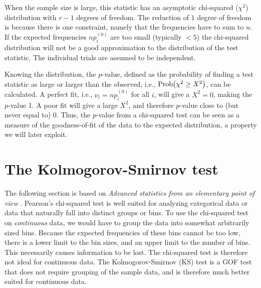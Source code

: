 When the sample size is large, this statistic has an asymptotic chi-squared ($\chi^2\label{eq:chisquared}$) distribution with $r-1$ degrees of freedom. The reduction of $1$ degree of freedom is because there is one constraint, namely that the frequencies have to sum to $n$. If the expected frequencies $np_i^{(0)}$ are too small (typically $< 5$) the chi-squared distribution will not be a good approximation to the distribution of the test statistic. The individual trials are assumed to be independent. 

Knowing the distribution, the $p$-value, defined as the probability of finding a test statistic as large or larger than the observed, i.e., $\text{Prob}\!\left(\chi^2 \ge X^2\right)$, can be calculated. A perfect fit, i.e., $\nu_i = np_i^{(0)}$ for all $i$, will give a $X^2 = 0$, making the $p$-value 1. A poor fit will give a large $X^2$, and therefore $p$-value close to (but never equal to) 0. Thus, the $p$-value from a chi-squared test can be seen as a measure of the goodness-of-fit of the data to the expected distribution, a property we will later exploit.



\section{The Kolmogorov-Smirnov test\label{sec:ks}}

The following section is based on \emph{Advanced statistics from an elementary point of view} . Pearson's chi-squared test is well suited for analyzing categorical data or data that naturally fall into distinct groups or bins. To use the chi-squared test on \emph{continuous} data, we would have to group the data into somewhat arbitrarily sized bins. Because the expected frequencies of these bins cannot be too low, there is a lower limit to the bin sizes, and  an upper limit to the number of bins. This necessarily causes information to be lost. The chi-squared test is therefore not ideal for continuous data. The Kolmogorov-Smirnov (KS) test is a GOF test that does not require grouping of the sample data, and is therefore much better suited for continuous data. 

